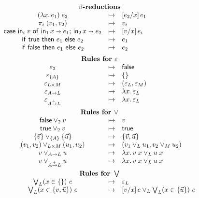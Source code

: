\documentclass{article}
\begin{document}
\[
\begin{array}{ccl}
  \multicolumn{3}{c}{\textbf{$\beta$-reductions}}\\
  (\fn\bind{x}e_1) \; e_2 &\step& \sub{e_2/x} e_1\\
  \pi_i \; (v_1, v_2) &\step& v_i\\
  \case{\ms{in}_i\; v}{x}{e_1}{x}{e_2} &\step& \sub{v/x} e_i\\
  \ifthen{\ms{true}}{e_1}{e_2} &\step& e_1\\
  \ifthen{\ms{false}}{e_1}{e_2} &\step& e_2

  \vspace{0.5em}\\
  \multicolumn{3}{c}{\textbf{Rules for }\unit}\\
  \unit_2 &\step& \ms{false}\\
  \unit_{\Set{A}} &\step& \{\}\\
  \unit_{L \x M} &\step& (\unit_L, \unit_M)\\
  \unit_{A \to L} &\step& \fn\bind{x} \unit_L\\
  \unit_{A \mto L} &\step& \fn\bind{x} \unit_L

  \vspace{0.5em}\\
  \multicolumn{3}{c}{\textbf{Rules for }\vee}\\
  \ms{false} \vee_2 v &\step& v\\
  \ms{true} \vee_2 v &\step& \ms{true}\\
  \setlit{\vec{v}} \vee_{\Set{A}} \setlit{\vec{u}} &\step& \setlit{\vec{v}, \vec{u}}\\
  (v_1, v_2) \vee_{L \x M} (u_1, u_2) &\step& (v_1 \vee_L u_1, v_2 \vee_M u_2)\\
  v \vee_{A \to L} u &\step& \fn\bind{x} v\;x \vee_L u\;x\\
  v \vee_{A \mto L} u &\step& \fn\bind{x} v\;x \vee_L u\;x

  \vspace{0.5em}\\
  \multicolumn{3}{c}{\textbf{Rules for }\bigvee}\\
  \tforin{L}{x \in \{\}} e &\step& \unit_L\\
  \tforin{L}{x \in \setlit{v, \vec{u}}} e
  &\step& \sub{v/x} e \vee_L \tforin{L}{x \in \setlit{\vec{u}}} e


\end{array}\]
\end{document}
